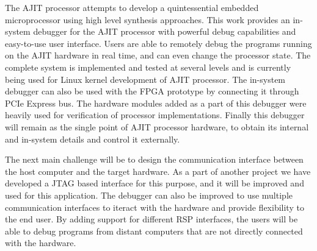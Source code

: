 
The AJIT processor attempts to develop a quintessential embedded microprocessor using high level synthesis approaches. This work provides an in-system debugger for the AJIT processor  with powerful debug capabilities and easy-to-use user interface. Users are able to remotely debug the programs running on the AJIT hardware in real time, and can even change the processor state. The complete system is implemented and tested at several levels and is currently being used for Linux kernel development of AJIT processor. The in-system debugger can also be used with the FPGA prototype by connecting it through PCIe Express bus. The hardware modules added as a part of this debugger were heavily used for verification of processor implementations. Finally this debugger will remain as the single point of AJIT processor hardware, to obtain its internal and in-system details and control it externally.


\vspace{0.5em}
\forceindent The next main challenge will be to design the communication interface between the host computer and the target hardware. As a part of another project\cite{scanchainManual} we have developed a JTAG based interface for this purpose, and it will be improved and used for this application. The debugger can also be improved to use multiple communication interfaces to iteract with the hardware and provide flexibility to the end user. By adding support for different RSP interfaces, the users will be able to debug programs from distant computers that are not directly connected with the hardware.
